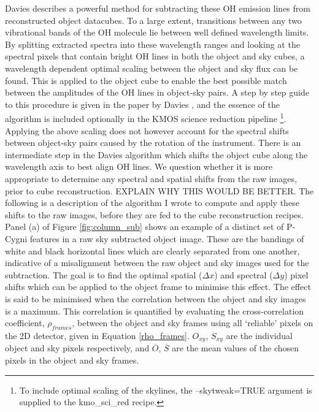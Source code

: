 \documentclass{literature}
\begin{document}
Davies \citep{Davies2007} describes a powerful method for subtracting these OH emission lines from reconstructed object datacubes. To a large extent, transitions between any two vibrational bands of the OH molecule lie between well defined wavelength limits. By splitting extracted spectra into these wavelength ranges and looking at the spectral pixels that contain bright OH lines in both the object and sky cubes, a wavelength dependent optimal scaling between the object and sky flux can be found. This is applied to the object cube to enable the best possible match between the amplitudes of the OH lines in object-sky pairs. A step by step guide to this procedure is given in the paper by Davies \citep{Davies2007}, and the essence of the algorithm is included optionally in the KMOS science reduction pipeline \footnote{To include optimal scaling of the skylines, the --skytweak=TRUE argument is supplied to the kmo\_sci\_red recipe.}. Applying the above scaling does not however account for the spectral shifts between object-sky pairs caused by the rotation of the instrument. There is an intermediate step in the Davies algorithm which shifts the object cube along the wavelength axis to best align OH lines. We question whether it is more appropriate to determine any spectral and spatial shifts from the raw images, prior to cube reconstruction. EXPLAIN WHY THIS WOULD BE BETTER. The following is a description of the algorithm I wrote to compute and apply these shifts to the raw images, before they are fed to the cube reconstruction recipes. \\ 

Panel (a) of Figure \ref{fig:column_sub} shows an example of a distinct set of P-Cygni features in a raw sky subtracted object image. These are the bandings of white and black horizontal lines which are clearly separated from one another, indicative of a misalignment between the raw object and sky images used for the subtraction. The goal is to find the optimal spatial ($\Delta x$) and spectral ($\Delta y$) pixel shifts which can be applied to the object frame to minimise this effect. The effect is said to be minimised when the correlation between the object and sky images is a maximum. This correlation is quantified by evaluating the cross-correlation coefficient, $\rho _{frames}$, between the object and sky frames using all `reliable' pixels on the 2D detector, given in Equation \ref{rho_frames}. $O_{xy}$, $S_{xy}$ are the individual object and sky pixels respectively, and $\overline{O}$, $\overline{S}$ are the mean values of the chosen pixels in the object and sky frames. 
\end{document}

